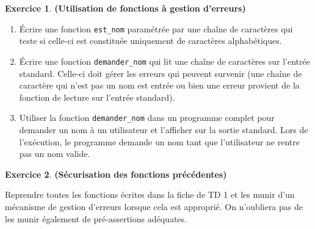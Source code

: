 \documentclass[12pt]{article}
\theoremstyle{definition}
\newtheorem{Exercice}{Exercice}
\begin{document}
\begin{Exercice} {\bf (Utilisation de fonctions à gestion d'erreurs)}\smallskip

\begin{enumerate}
    \item Écrire une fonction {\tt est\_nom} paramétrée par une 
    chaîne de caractères qui teste si celle-ci est constituée uniquement 
    de caractères alphabétiques.
    \smallskip
    
    \item Écrire une fonction {\tt demander\_nom} qui lit une chaîne 
    de caractères sur l'entrée standard. Celle-ci doit gérer les erreurs
    qui peuvent survenir (une chaîne de caractère qui n'est pas un nom 
    est entrée ou bien une erreur provient de la fonction de lecture sur 
    l'entrée standard).
    \smallskip
    
    \item Utiliser la fonction {\tt demander\_nom} dans un programme 
    complet pour demander un nom à un utilisateur et l'afficher sur 
    la sortie standard. Lors de l'exécution, le programme demande un nom
    tant que l'utilisateur ne rentre pas un nom valide.
\end{enumerate}
\end{Exercice}
\bigskip

\begin{Exercice} {\bf (Sécurisation des fonctions précédentes)}\smallskip

Reprendre toutes les fonctions écrites dans la fiche de TD 1 et les 
munir d'un mécanisme de gestion d'erreurs lorsque cela est approprié.
On n'oubliera pas de les munir également de pré-assertions adéquates.
\end{Exercice}
\bigskip
\end{document}

